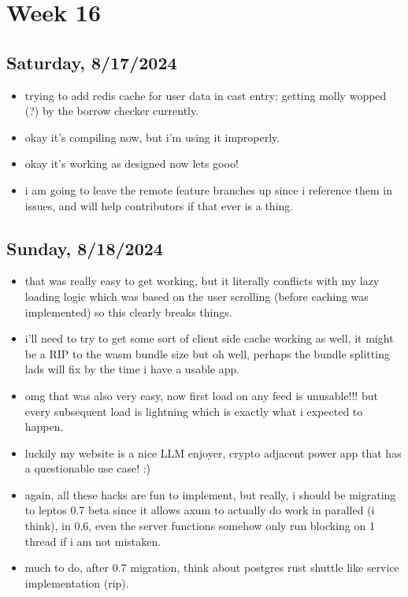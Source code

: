 \newpage
\section{Week 16}

\subsection*{Saturday, 8/17/2024}
\begin{itemize}
    \item trying to add redis cache for user data in cast entry; getting molly
        wopped (?) by the borrow checker currently.
    \item okay it's compiling now, but i'm using it improperly.
    \item okay it's working as designed now lets gooo!
    \item i am going to leave the remote feature branches up since i reference
        them in issues, and will help contributors if that ever is a thing.
\end{itemize}

\subsection*{Sunday, 8/18/2024}
\begin{itemize}
    \item that was really easy to get working, but it literally conflicts with
        my lazy loading logic which was based on the user scrolling (before
        caching was implemented) so this clearly breaks things.
    \item i'll need to try to get some sort of client side cache working as
        well, it might be a RIP to the wasm bundle size but oh well, perhaps the
        bundle splitting lads will fix by the time i have a usable app.
    \item omg that was also very easy, now first load on any feed is unusable!!!
        but every subsequent load is lightning which is exactly what i expected
        to happen.
    \item luckily my website is a nice LLM enjoyer, crypto adjacent power app
        that has a questionable use case! :)
    \item again, all these hacks are fun to implement, but really, i should be
        migrating to leptos 0.7 beta since it allows axum to actually do work in
        paralled (i think), in 0.6, even the server functions somehow only run
        blocking on 1 thread if i am not mistaken.
    \item much to do, after 0.7 migration, think about postgres rust shuttle
        like service implementation (rip).
\end{itemize}

